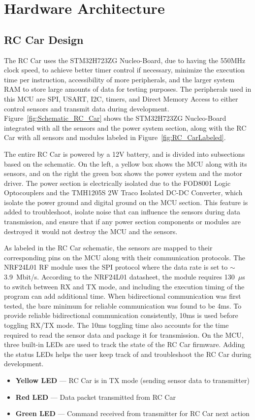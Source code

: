 \documentclass[conference]{IEEEtran}
\begin{document}
	\section{Hardware Architecture}
	\label{sec:hardware}
	
	\subsection{RC Car Design}
	
	The RC Car uses the STM32H723ZG Nucleo-Board, due to having the 550MHz clock
	speed, to achieve better timer control if necessary, minimize the execution
	time per instruction, accessibility of more peripherals, and the larger system
	RAM to store large amounts of data for testing purposes. The peripherals used
	in this MCU are SPI, USART, I2C, timers, and Direct Memory Access to either
	control sensors and transmit data during development. Figure~\ref{fig:Schematic_RC_Car}
	shows the STM32H723ZG Nucleo-Board integrated with all the sensors and the
	power system section, along with the RC Car with all sensors and modules
	labeled in Figure~\ref{fig:RC_CarLabeled}.
	
	The entire RC Car is powered by a 12V battery, and is divided into subsections
	based on the schematic. On the left, a yellow box shows the MCU along with its
	sensors, and on the right the green box shows the power system and the motor
	driver. The power section is electrically isolated due to the FOD8001 Logic
	Optocouplers and the TMH1205S 2W Traco Isolated DC-DC Converter, which isolate
	the power ground and digital ground on the MCU section. This feature is added
	to troubleshoot, isolate noise that can influence the sensors during data
	transmission, and ensure that if any power section components or modules are
	destroyed it would not destroy the MCU and the sensors.
	
	As labeled in the RC Car schematic, the sensors are mapped to their
	corresponding pins on the MCU along with their communication protocols. The
	NRF24L01 RF module uses the SPI protocol where the data rate is set to
	$\sim$3.9~Mbit/s. According to the NRF24L01 datasheet, the module requires
	130~$\mu$s to switch between RX and TX mode, and including the execution
	timing of the program can add additional time. When bidirectional communication
	was first tested, the bare minimum for reliable communication was found to be
	4ms. To provide reliable bidirectional communication consistently, 10ms is used
	before toggling RX/TX mode. The 10ms toggling time also accounts for the time
	required to read the sensor data and package it for transmission. On the MCU,
	three built-in LEDs are used to track the state of the RC Car firmware.
	Adding the status LEDs helps the user keep track of and troubleshoot the RC Car
	during development.
	\begin{itemize}
		\item \textbf{Yellow LED} — RC Car is in TX mode (sending sensor data to transmitter)
		\item \textbf{Red LED} — Data packet transmitted from RC Car
		\item \textbf{Green LED} — Command received from transmitter for RC Car next action
	\end{itemize}
	
\end{document}

